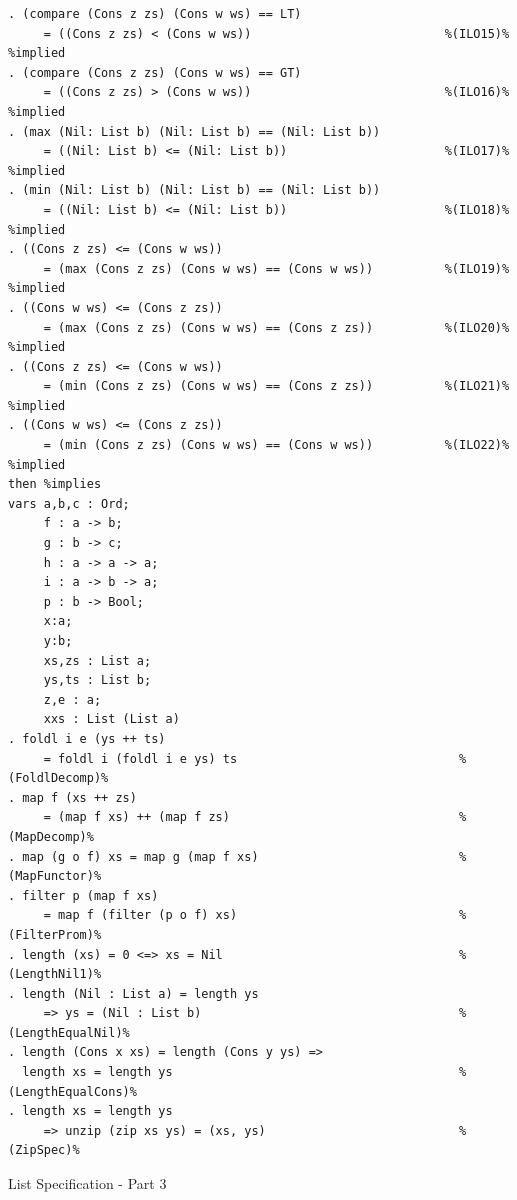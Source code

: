 \documentclass[12pt,twoside]{article}
\numberwithin{spec}{subsection}
\numberwithin{proof}{subsection}
\numberwithin{figure}{subsection}
\numberwithin{code}{subsection}
\begin{document}
\addtocounter{spec}{-1}
\begin{spec}
\begin{verbatim}
. (compare (Cons z zs) (Cons w ws) == LT)
     = ((Cons z zs) < (Cons w ws))                           %(ILO15)% %implied
. (compare (Cons z zs) (Cons w ws) == GT)
     = ((Cons z zs) > (Cons w ws))                           %(ILO16)% %implied
. (max (Nil: List b) (Nil: List b) == (Nil: List b)) 
     = ((Nil: List b) <= (Nil: List b))                      %(ILO17)% %implied
. (min (Nil: List b) (Nil: List b) == (Nil: List b)) 
     = ((Nil: List b) <= (Nil: List b))                      %(ILO18)% %implied
. ((Cons z zs) <= (Cons w ws))
     = (max (Cons z zs) (Cons w ws) == (Cons w ws))          %(ILO19)% %implied
. ((Cons w ws) <= (Cons z zs))
     = (max (Cons z zs) (Cons w ws) == (Cons z zs))          %(ILO20)% %implied
. ((Cons z zs) <= (Cons w ws))
     = (min (Cons z zs) (Cons w ws) == (Cons z zs))          %(ILO21)% %implied
. ((Cons w ws) <= (Cons z zs))
     = (min (Cons z zs) (Cons w ws) == (Cons w ws))          %(ILO22)% %implied
then %implies
vars a,b,c : Ord;
     f : a -> b;
     g : b -> c;
     h : a -> a -> a;
     i : a -> b -> a;
     p : b -> Bool;
     x:a;
     y:b;
     xs,zs : List a;
     ys,ts : List b;
     z,e : a;
     xxs : List (List a)
. foldl i e (ys ++ ts) 
     = foldl i (foldl i e ys) ts                               %(FoldlDecomp)%
. map f (xs ++ zs) 
     = (map f xs) ++ (map f zs)                                %(MapDecomp)%
. map (g o f) xs = map g (map f xs)                            %(MapFunctor)%
. filter p (map f xs) 
     = map f (filter (p o f) xs)                               %(FilterProm)%
. length (xs) = 0 <=> xs = Nil                                 %(LengthNil1)%  
. length (Nil : List a) = length ys
     => ys = (Nil : List b)                                    %(LengthEqualNil)%
. length (Cons x xs) = length (Cons y ys) =>
  length xs = length ys                                        %(LengthEqualCons)%
. length xs = length ys
     => unzip (zip xs ys) = (xs, ys)                           %(ZipSpec)%
\end{verbatim}
\caption{List Specification - Part 3}
\end{spec}
\end{document}
